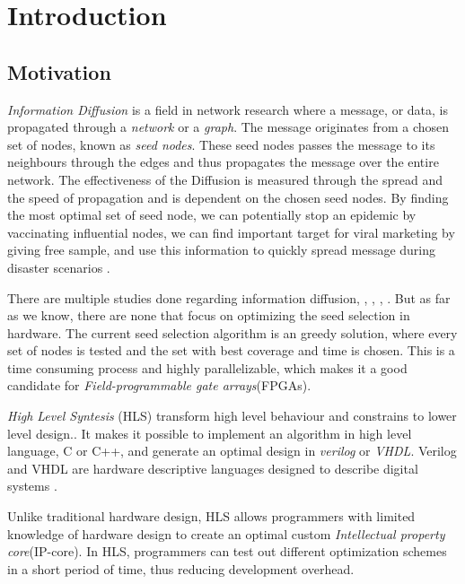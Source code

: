 \chapter{Introduction} \label{intro}

\section{Motivation}
\textit{Information Diffusion} is a field in network research where a message, or data, is propagated through a \textit{network} or a \textit{graph}. The message originates from a chosen set of nodes, known as \textit{seed nodes}. These seed nodes passes the message to its neighbours through the edges and thus propagates the message over the entire network. The effectiveness of the Diffusion is measured through the spread and the speed of propagation and is dependent on the chosen seed nodes. By finding the most optimal set of seed node, we can potentially stop an epidemic by vaccinating influential nodes, we can find important target for viral marketing by giving free sample, and use this information to quickly spread message during disaster scenarios\cite{InformationDiffusionThroughBlogspace} \cite{Romero:2011:DMI:1963405.1963503}.

There are multiple studies done regarding information diffusion, \cite{cha2010measuring}, \cite{InformationDiffusionThroughBlogspace}, \cite{5694014},  \cite{InfoDiffAndExternalInfluInNetworks}. But as far as we know, there are none that focus on optimizing the seed selection in hardware. The current seed selection algorithm is an greedy solution\cite{greedyInfluenc2005}, where every set of nodes is tested and the set with best coverage and time is chosen. This is a time consuming process and highly parallelizable, which makes it a good candidate for \textit{Field-programmable gate arrays}(FPGAs). 

\textit{High Level Syntesis} (HLS) transform high level behaviour and constrains to lower level design.\cite{52214}. It makes it possible to implement an algorithm in high level language, C or C++, and generate an optimal design in \textit{verilog} or \textit{VHDL}. Verilog and VHDL are hardware descriptive languages designed to describe digital systems \cite{thomas2008verilog}. 

Unlike traditional hardware design, HLS allows programmers with limited knowledge of hardware design to create an optimal custom \textit{Intellectual property core}(IP-core). In HLS, programmers can test out different optimization schemes in a short period of time, thus reducing development overhead.  

